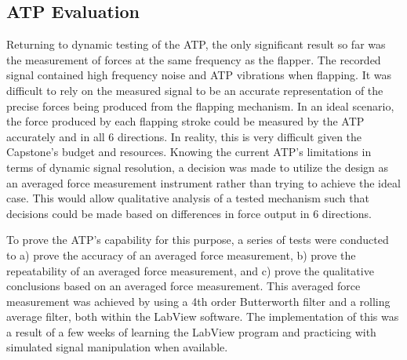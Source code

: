 \subsection{ATP Evaluation}
Returning to dynamic testing of the ATP, the only significant result so far was the measurement of forces at the same frequency as the flapper. The recorded signal contained high frequency noise and ATP vibrations when flapping. It was difficult to rely on the measured signal to be an accurate representation of the precise forces being produced from the flapping mechanism. In an ideal scenario, the force produced by each flapping stroke could be measured by the ATP accurately and in all 6 directions. In reality, this is very difficult given the Capstone’s budget and resources. Knowing the current ATP’s limitations in terms of dynamic signal resolution, a decision was made to utilize the design as an averaged force measurement instrument rather than trying to achieve the ideal case. This would allow qualitative analysis of a tested mechanism such that decisions could be made based on differences in force output in 6 directions.

To prove the ATP’s capability for this purpose, a series of tests were conducted to a) prove the accuracy of an averaged force measurement, b) prove the repeatability of an averaged force measurement, and c) prove the qualitative conclusions based on an averaged force measurement. This averaged force measurement was achieved by using a 4th order Butterworth filter and a rolling average filter, both within the LabView software. The implementation of this was a result of a few weeks of learning the LabView program and practicing with simulated signal manipulation when available.

